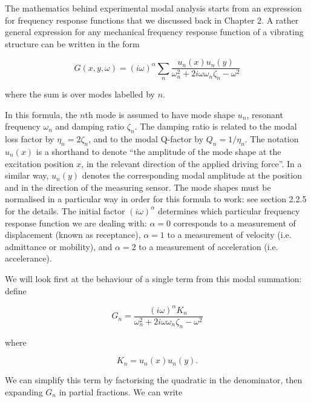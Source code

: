   The mathematics behind experimental modal analysis starts from an expression 
  for frequency response functions that we discussed back in Chapter 2. A 
  rather general expression for any mechanical frequency response function of a 
  vibrating structure can be written in the form 

  \begin{equation*}G(x,y,\omega) = (i \omega)^\alpha \sum_n \dfrac{u_n(x) 
  u_n(y)}{\omega_n^2+2i\omega \omega_n \zeta_n-\omega^2} \tag{1}\end{equation*} 

  \noindent{}where the sum is over modes labelled by $n$. 

  In this formula, the $n$th mode is assumed to have mode shape $u_n$, resonant 
  frequency $\omega_n$ and damping ratio $\zeta_n$. The damping ratio is 
  related to the modal loss factor by $\eta_n = 2 \zeta_n$, and to the modal 
  Q-factor by $Q_n=1/\eta_n$. The notation $u_n(x)$ is a shorthand to denote 
  ``the amplitude of the mode shape at the excitation position $x$, in the 
  relevant direction of the applied driving force''. In a similar way, $u_n(y)$ 
  denotes the corresponding modal amplitude at the position and in the 
  direction of the measuring sensor. The mode shapes must be normalised in a 
  particular way in order for this formula to work: see section 2.2.5 for the 
  details. The initial factor $(i \omega)^\alpha$ determines which particular 
  frequency response function we are dealing with: $\alpha=0$ corresponds to a 
  measurement of displacement (known as receptance), $\alpha=1$ to a 
  measurement of velocity (i.e. admittance or mobility), and $\alpha=2$ to a 
  measurement of acceleration (i.e. accelerance). 

  We will look first at the behaviour of a single term from this modal 
  summation: define 

  \begin{equation*}G_n = \dfrac{(i \omega)^\alpha K_n}{\omega_n^2+2i\omega 
  \omega_n \zeta_n-\omega^2} \tag{2}\end{equation*} 

  \noindent{}where 

  \begin{equation*}K_n= u_n(x) u_n(y) . \tag{3}\end{equation*} 

  We can simplify this term by factorising the quadratic in the denominator, 
  then expanding $G_n$ in partial fractions. We can write 

